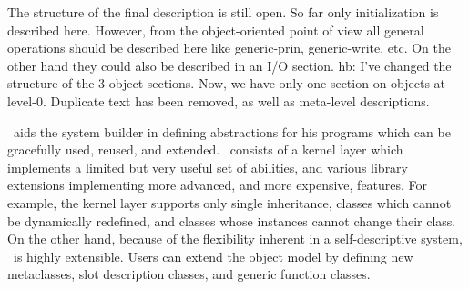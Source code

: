 %
\label{obj-0}
\label{telos0}
%
\begin{optPrivate}
    The structure of the final description is still open.  So far only
    initialization is described here. However, from the object-oriented point of
    view all general operations should be described here like generic-prin,
    generic-write, etc. On the other hand they could also be described in an I/O
    section.  hb: I've changed the structure of the 3 object sections. Now, we
    have only one section on objects at level-0. Duplicate text has been
    removed, as well as meta-level descriptions.
\end{optPrivate}
%
\begin{optRationale}
    \telos\ aids the system builder in defining abstractions for his programs
    which can be gracefully used, reused, and extended.  \telos\ consists of a
    kernel layer which implements a limited but very useful set of abilities,
    and various library extensions implementing more advanced, and more
    expensive, features.  For example, the kernel layer supports only single
    inheritance, classes which cannot be dynamically redefined, and classes
    whose instances cannot change their class.  On the other hand, because of
    the flexibility inherent in a self-descriptive system, \telos\ is highly
    extensible.  Users can extend the object model by defining new metaclasses,
    slot description classes, and generic function classes.
\end{optRationale}
%
